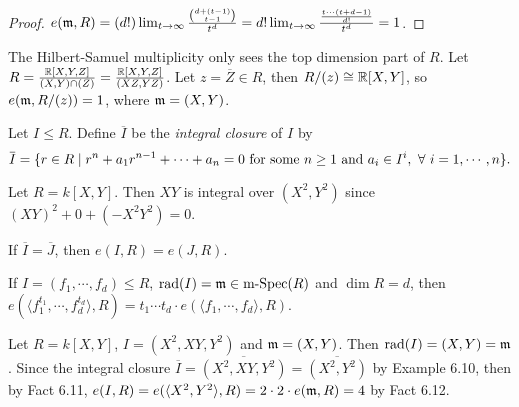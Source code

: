 \begin{proof}
    $e(\mathfrak{m},R) = (d!) \lim_{t \to \infty} \frac{\binom{d+(t-1)}{t-1}}{t^{d}} = d! \lim_{t \to \infty} \frac{\frac{t \cdots (t+d-1)}{d!}}{t^{d}} = 1$.
\end{proof}

\begin{fact}
    The Hilbert-Samuel multiplicity only sees the top dimension part of $R$. Let $R = \frac{\mathbb{R}[X,Y,Z]}{(X,Y) \cap (Z)} = \frac{\mathbb{R}[X,Y,Z]}{(XZ,YZ)}$. Let $z = \overbar{Z} \in R$, then $R/(z) \cong \mathbb{R}[X,Y]$, so $e(\mathfrak{m},R/(z)) = 1$, where $\mathfrak{m} = (X,Y)$.
\end{fact}

\begin{definition}
    Let $I \leq R$. Define $\overbar{I}$ be the \emph{integral closure} of $I$ by 
    \[\overbar{I} = \{r \in R \mid r^{n} + a_1r^{n-1} + \cdots + a_n = 0 \text{ for some $n \geq 1$ and $a_i \in I^{i}$}, \fa i = 1,\cdots,n\}.\]
\end{definition}

\begin{example}
    Let $R = k[X,Y]$. Then $XY$ is integral over $(X^{2},Y^{2})$ since $(XY)^{2} + 0 + (-X^{2}Y^{2}) = 0$.
\end{example}

\begin{fact}
    If $\overbar{I} = \overbar{J}$, then $e(I,R) = e(J,R)$.
\end{fact}

\begin{fact}
    If $I = (f_1,\cdots,f_d) \leq R$, $\operatorname{rad}(I) = \mathfrak{m} \in \operatorname{m-Spec}(R)$ and $\dim R = d$, then $e(\langle f_1^{t_1},\cdots,f_d^{t_d} \rangle,R) = t_1 \cdots t_d \cdot e(\langle f_1,\cdots,f_d \rangle,R)$.
\end{fact}

\begin{example}
    Let $R = k[X,Y]$, $I = (X^{2},XY,Y^{2})$ and $\mathfrak{m} = (X,Y)$. Then $\operatorname{rad}(I) = (X,Y) = \mathfrak{m}$. Since the integral closure $\overbar{I} = \overbar{(X^{2},XY,Y^{2})} = \overbar{(X^{2},Y^{2})}$ by Example 6.10, then by Fact 6.11, $e(I,R) = e(\langle X^{2},Y^{2} \rangle, R) = 2 \cdot 2 \cdot e(\mathfrak{m},R) = 4$ by Fact 6.12.
\end{example}


